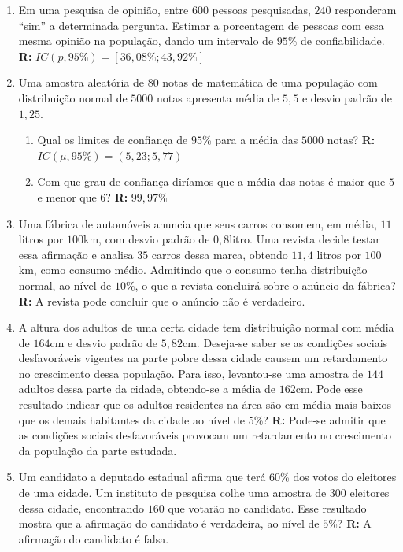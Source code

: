 \documentclass[oneside,a4paper,12pt]{article}
\begin{document}
\begin{enumerate}
	\item Em uma pesquisa de opinião, entre $600$ pessoas pesquisadas, $240$ responderam ``sim'' a determinada pergunta. Estimar a porcentagem de pessoas com essa mesma opinião na população, dando um intervalo de $95$\% de confiabilidade. {\bf R: } $IC(p,95\%) = [36,08\%;43,92\%]$

	\item Uma amostra aleatória de $80$ notas de matemática de uma população com distribuição normal de $5000$ notas apresenta média de $5,5$ e desvio padrão de $1,25$.
	\begin{enumerate}
		\item Qual os limites de confiança de $95$\% para a média das $5000$ notas? {\bf R: } $IC(\mu,95\%) = (5,23;5,77)$
		\item Com que grau de confiança diríamos que a média das notas é maior que $5$ e menor que $6$? {\bf R: } $99,97$\%
	\end{enumerate}
	
	\item Uma fábrica de automóveis anuncia que seus carros consomem, em média, $11$ litros por $100$km, com desvio padrão de $0,8$litro. Uma revista decide testar essa afirmação e analisa $35$ carros dessa marca, obtendo $11,4$ litros por $100$km, como consumo médio. Admitindo que o consumo tenha distribuição normal, ao nível de $10$\%, o que a revista concluirá sobre o anúncio da fábrica? {\bf R: } A revista pode concluir que o anúncio não é verdadeiro.
	
	\item A altura dos adultos de uma certa cidade tem distribuição normal com média de $164$cm e desvio padrão de $5,82$cm. Deseja-se saber se as condições sociais desfavoráveis vigentes na parte pobre dessa cidade causem um retardamento no crescimento dessa população. Para isso, levantou-se uma amostra de $144$ adultos dessa parte da cidade, obtendo-se a média de $162$cm. Pode esse resultado indicar que os adultos residentes na área são em média mais baixos que os demais habitantes da cidade ao nível de $5$\%? {\bf R: } Pode-se admitir que as condições sociais desfavoráveis provocam um retardamento no crescimento da população da parte estudada.

	\item Um candidato a deputado estadual afirma que terá $60$\% dos votos do eleitores de uma cidade. Um instituto de pesquisa colhe uma amostra de $300$ eleitores dessa cidade, encontrando $160$ que votarão no candidato. Esse resultado mostra que a afirmação do candidato é verdadeira, ao nível de $5$\%? {\bf R: } A afirmação do candidato é falsa.


\end{enumerate}
\end{document}
